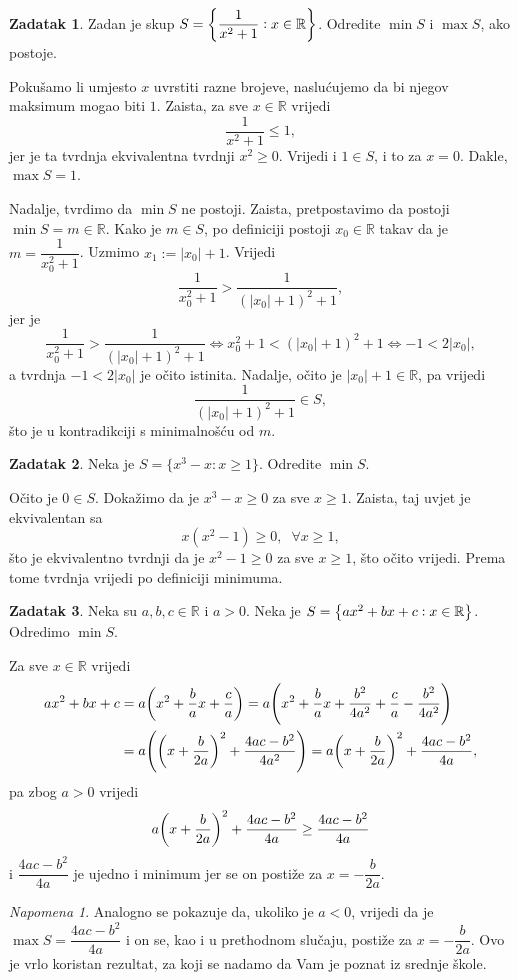 \documentclass{book}
\let\originalleft\left
\let\originalright\right
\renewcommand{\left}{\mathopen{}\mathclose\bgroup\originalleft}
\renewcommand{\right}{\aftergroup\egroup\originalright}
\renewenvironment{proof}{%
    \vspace{-\parskip}\begin{oldproof}%
    }{%
    \end{oldproof}%
}
\theoremstyle{definition}
\theoremstyle{definition}
\newtheorem{exercise}{Zadatak}
\theoremstyle{remark}
\newtheorem{remark}{Napomena}
\begin{document}
\begin{exercise}
Zadan je skup $S=\left\{\dfrac{1}{x^2+1} : x\in \mathbb{R}\right\}$. Odredite $\min{S}$ i $\max{S}$, ako postoje.
\end{exercise}
\begin{proof}[Rješenje]
Pokušamo li umjesto $x$ uvrstiti razne brojeve, naslućujemo da bi njegov maksimum mogao biti $1$. Zaista, za sve $x\in \mathbb{R}$ vrijedi $$\dfrac{1}{x^2+1}\leq 1,$$ jer je ta tvrdnja ekvivalentna tvrdnji $x^2\geq 0$. Vrijedi i $1\in S$, i to za $x=0$. Dakle, $\max{S}=1$. 

Nadalje, tvrdimo da $\min{S}$ ne postoji. Zaista, pretpostavimo da postoji $\min{S}=m\in \mathbb{R}$. Kako je $m\in S$, po definiciji postoji $x_0\in \mathbb{R}$ takav da je $m=\dfrac{1}{x_0^2+1}$. Uzmimo $x_1:=|x_0|+1$. Vrijedi $$\dfrac{1}{x_0^2+1}> \dfrac{1}{(|x_0|+1)^2+1},$$
jer je
$$\dfrac{1}{x_0^2+1}> \dfrac{1}{(|x_0|+1)^2+1}\Leftrightarrow x_0^2+1<(|x_0|+1)^2+1\Leftrightarrow -1<2|x_0|,$$
a tvrdnja $-1<2|x_0|$ je očito istinita. Nadalje, očito je $|x_0|+1\in \mathbb{R}$, pa vrijedi $$\dfrac{1}{(|x_0|+1)^2+1}\in S,$$ što je u kontradikciji s minimalnošću od $m$.
\end{proof}
\begin{exercise}
Neka je $S=\{x^3-x : x\geq 1\}$. Odredite $\min{S}$.
\end{exercise}
\begin{proof}[Rješenje]
Očito je $0\in S$. Dokažimo da je $x^3-x\geq 0$ za sve $x\geq 1$. Zaista, taj uvjet je ekvivalentan sa 
$$x(x^2-1)\geq 0, \;\; \forall x\geq 1,$$
što je ekvivalentno tvrdnji da je $x^2-1\geq 0$ za sve $x\geq 1$, što očito vrijedi. Prema tome tvrdnja vrijedi po definiciji minimuma.
\end{proof}
\begin{exercise}
\label{tjeme}
Neka su $a, b, c\in \mathbb{R}$ i $a> 0$. Neka je $S=\left\{ax^2+bx+c : x\in \mathbb{R}\right\}$. Odredimo $\min{S}$.
\end{exercise}
\begin{proof}[Rješenje]
Za sve $x\in \mathbb{R}$ vrijedi
\begin{align*}
ax^2+bx+c&=a\left(x^2+\dfrac{b}{a}x+\dfrac{c}{a}\right)=a\left(x^2+\dfrac{b}{a}x+\dfrac{b^2}{4a^2}+\dfrac{c}{a}-\dfrac{b^2}{4a^2}\right)\\
&=a\left(\left(x+\dfrac{b}{2a}\right)^2+\dfrac{4ac-b^2}{4a^2}\right)=a\left(x+\dfrac{b}{2a}\right)^2+\dfrac{4ac-b^2}{4a},
\end{align*}
pa zbog $a>0$ vrijedi $$a\left(x+\dfrac{b}{2a}\right)^2+\dfrac{4ac-b^2}{4a}\geq \dfrac{4ac-b^2}{4a}$$ 
i $\dfrac{4ac-b^2}{4a}$ je ujedno i minimum jer se on postiže za $x=-\dfrac{b}{2a}$.
\end{proof}
\begin{remark}
Analogno se pokazuje da, ukoliko je $a<0$, vrijedi da je $\max{S}=\dfrac{4ac-b^2}{4a}$ i on se, kao i u prethodnom slučaju, postiže za $x=-\dfrac{b}{2a}$. Ovo je vrlo koristan rezultat, za koji se nadamo da Vam je poznat iz srednje škole.
\end{remark}
\end{document}
